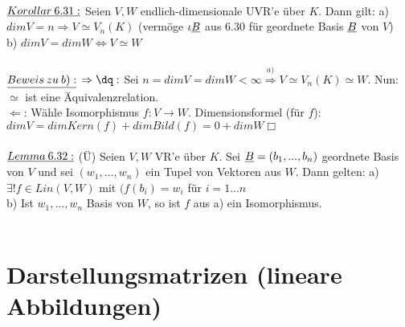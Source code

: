 \documentclass[fleqn, a4paper, 11pt]{scrartcl}
\theoremstyle{definition}
\begin{document}
\\
$\uline{Korollar\:6.31:}$ Seien $V,W$ endlich-dimensionale UVR'e über $K$. Dann gilt: a) $dim V=n\Rightarrow V\simeq V_n(K)$ (vermöge $\iota\uline{B}$ aus 6.30 für geordnete Basis $\uline{B}$ von $V$)\\
b) $dim V=dim W\Leftrightarrow V\simeq W$\\
\\
$\uline{Beweis\:zu\:b):}$ \dq$\Rightarrow\dq:$ Sei $n=dim V=dim W<\infty\stackrel{a)}{\Rightarrow}V\simeq V_n(K)\simeq W$. Nun: $\simeq$ ist eine Äquivalenzrelation.\\
\dq$\Leftarrow$\dq: Wähle Isomorphismus $f:V\rightarrow W$. Dimensionsformel (\dq für $f$\dq): $dim V=dim Kern(f)+dim Bild(f)=0+dim W$\hfill $\Box$\\
\\
$\uline{Lemma\:6.32:}$ (\"U) Seien $V,W$ VR'e über $K$. Sei $\uline{B}=(b_1,...,b_n)$ geordnete Basis von $V$ und sei $(w_1,...,w_n)$ ein Tupel von Vektoren aus $W$. Dann gelten: a) $\exists !f\in Lin(V,W)$ mit $(f(b_i)=w_i$ für $i=1...n$\\
b) Ist $w_1,...,w_n$ Basis von $W$, so ist $f$ aus a) ein Isomorphismus.\\
\\
\newpage
\section{Darstellungsmatrizen (lineare Abbildungen)}
\end{document}
